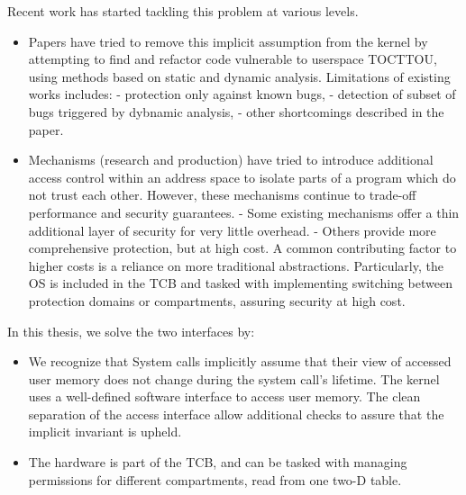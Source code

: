 Recent work has started tackling this problem at various levels. 
\begin{itemize}
  \item Papers have tried to remove this implicit assumption from the kernel by attempting to find and 
        refactor code vulnerable to userspace TOCTTOU, using methods based on static and dynamic analysis.
        Limitations of existing works includes:
        - protection only against known bugs, 
        - detection of subset of bugs triggered by dybnamic analysis,
        - other shortcomings described in the paper.
  \item Mechanisms (research and production) have tried to introduce additional access control within an
        address space to isolate parts of a program which do not trust each other.
        However, these mechanisms continue to trade-off performance and security guarantees. 
        - Some existing mechanisms offer a thin additional layer of security for very little overhead.
        - Others provide more comprehensive protection, but at high cost.
        A common contributing factor to higher costs is a reliance on more traditional abstractions.
        Particularly, the OS is included in the TCB and tasked with implementing switching between
        protection domains or compartments, assuring security at high cost.
\end{itemize}

In this thesis, we solve the two interfaces by:
\begin{itemize}
  \item We recognize that
        System calls implicitly assume that their view of accessed user memory does not change
        during the system call's lifetime. 
        The kernel uses a well-defined software interface to access user memory. 
        The clean separation of the access interface allow additional checks to assure that 
        the implicit invariant is upheld.
  \item The hardware is part of the TCB, and can be tasked with managing permissions for different
        compartments, read from one two-D table.
\end{itemize}

